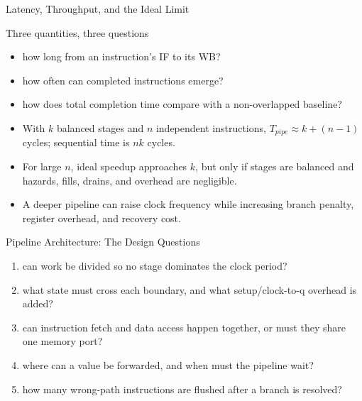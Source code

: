 \documentclass[aspectratio=169]{beamer}
\begin{document}
\begin{frame}{Latency, Throughput, and the Ideal Limit}
  \begin{block}{Three quantities, three questions}
    \begin{itemize}
      \item {} how long from an instruction's IF to its WB?
      \item {} how often can completed instructions emerge?
      \item {} how does total completion time compare with a
        non-overlapped baseline?
    \end{itemize}
  \end{block}
  \begin{itemize}
    \item With $k$ balanced stages and $n$ independent instructions,
      $T_{pipe}\approx k+(n-1)$ cycles; sequential time is $nk$ cycles.
    \item For large $n$, ideal speedup approaches $k$, but only if stages are
      balanced and hazards, fills, drains, and overhead are negligible.
    \item A deeper pipeline can raise clock frequency while increasing branch
      penalty, register overhead, and recovery cost.
  \end{itemize}
\end{frame}

\begin{frame}{Pipeline Architecture: The Design Questions}
  \begin{enumerate}
    \item {} can work be divided so no stage dominates the
      clock period?
    \item {} what state must cross each boundary, and
      what setup/clock-to-q overhead is added?
    \item {} can instruction fetch and data access
      happen together, or must they share one memory port?
    \item {} where can a value be forwarded, and when
      must the pipeline wait?
    \item {} how many wrong-path instructions are flushed
      after a branch is resolved?
  \end{enumerate}
\end{frame}
\end{document}
